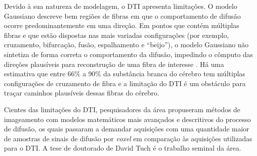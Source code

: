 \documentclass[
    12pt,                %
    oneside,            %
    a4paper,            %
    english,            %
    french,                %
    spanish,            %
    brazil                %
    ]{abntex2}
\begin{document}

Devido à sua natureza de modelagem, o DTI apresenta limitações. O modelo Gaussiano descreve bem regiões de fibras em que o comportamento de difusão ocorre predominantemente em uma direção. Em pontos que contém múltiplas fibras e que estão dispostas nas mais variadas configurações (por exemplo, cruzamento, bifurcação, fusão, espalhamento e
``beijo''), o modelo Gaussiano não sintetiza de forma correta o comportamento da difusão, impedindo o cômputo das direções plausíveis para reconstrução de uma fibra de interesse \cite{fillard2011, daducci2014}. Há uma estimativa que entre 66\% a 90\% da substância branca do cérebro tem múltiplas configurações de cruzamento de fibra \cite{descoteaux2015} e a limitação do DTI é um obstáculo para traçar caminhos plausíveis dessas fibras do cérebro.

Cientes das limitações do DTI, pesquisadores da área propuseram métodos de imageamento com modelos matemáticos mais avançados e descritivos do processo de difusão, os quais passaram a demandar aquisições
com uma quantidade maior de amostras de sinais de difusão por \textit{voxel} em comparação às aquisições utilizadas para o DTI. %
A tese de doutorado de David Tuch \cite{tuch2002} é o trabalho seminal da área.
\end{document}
